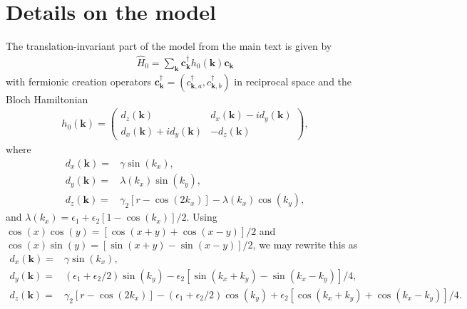 \documentclass[aps,prb,amsmath,amssymb,twocolumn, superscriptaddress]{revtex4-2}
\begin{document}
\appendix

\onecolumngrid

\section{Details on the model}
The translation-invariant part of the model from the main text is given by 
\begin{align}
\hat H_0 = \sum_{\bm k} \bm c_{\bm k}^\dagger h_0(\bm k) \bm c_{\bm k}
\end{align}
with fermionic creation operators $\bm c_{\bm k}^\dagger = (c_{\bm k, a}^\dagger, c_{\bm k, b}^\dagger)$ in reciprocal space and the Bloch Hamiltonian 
\begin{align}
h_0(\bm k) =
\begin{pmatrix}
d_z(\bm k) & d_x(\bm k) - i d_y(\bm k) \\
d_x(\bm k) + i d_y(\bm k) & - d_z(\bm k)
\end{pmatrix},
\end{align}
where 
\begin{align}
d_x(\bm k) =& \gamma  \sin(k_x), \nonumber \\
d_y(\bm k) =& \lambda(k_x)  \sin(k_y), \nonumber \\
d_z(\bm k) =&  \gamma_2[r - \cos(2 k_x)] - \lambda(k_x) \cos(k_y),
\end{align}
and $\lambda(k_x) = \epsilon_1 + \epsilon_2 \left[1 - \cos(k_x)\right]/2$. Using $\cos(x)\cos(y) = [\cos(x+y) + \cos(x-y)]/2$ and $\cos(x)\sin(y) = [\sin(x+y) - \sin(x-y)]/2$, we may rewrite this as
\begin{align}
d_x(\bm k) =& \gamma \sin(k_x), \nonumber \\
d_y(\bm k) =& (\epsilon_1 + \epsilon_2 / 2) \sin(k_y) -  \epsilon_2 [\sin(k_x + k_y) - \sin(k_x - k_y)] / 4, \nonumber \\
d_z(\bm k) =& \gamma_2[r - \cos(2 k_x)] - (\epsilon_1 + \epsilon_2 / 2)\cos(k_y) + \epsilon_2 [\cos(k_x + k_y) + \cos(k_x - k_y)] / 4. 
\end{align}
\end{document}
